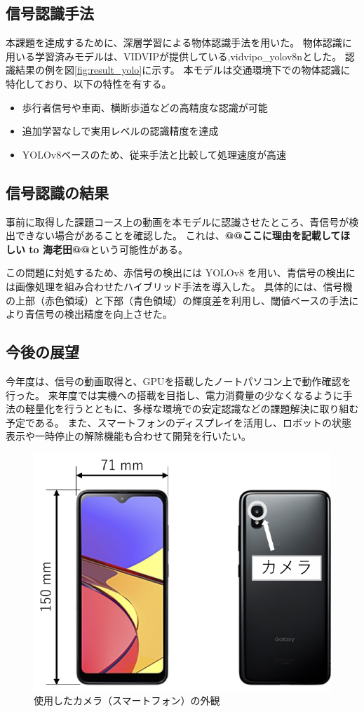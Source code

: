 \documentclass[twocolumn,9pt]{jsproceedings}
\begin{document}
\subsection{信号認識手法}
本課題を達成するために、深層学習による物体認識手法を用いた。
物体認識に用いる学習済みモデルは、VIDVIP\cite{BabaVIDVIP}が提供している,vidvipo\_yolov8nとした。
認識結果の例を図\ref{fig:result_yolo}に示す。
本モデルは交通環境下での物体認識に特化しており、以下の特性を有する。

\begin{itemize}
    \item 歩行者信号や車両、横断歩道などの高精度な認識が可能
    \item 追加学習なしで実用レベルの認識精度を達成
    \item YOLOv8ベースのため、従来手法と比較して処理速度が高速
\end{itemize}

\subsection{信号認識の結果}
事前に取得した課題コース上の動画を本モデルに認識させたところ、青信号が検出できない場合があることを確認した。
これは、\textbf{@@ここに理由を記載してほしい to 海老田@@}という可能性がある。

この問題に対処するため、赤信号の検出には YOLOv8 を用い、青信号の検出には画像処理を組み合わせたハイブリッド手法を導入した。
具体的には、信号機の上部（赤色領域）と下部（青色領域）の輝度差を利用し、閾値ベースの手法により青信号の検出精度を向上させた。

\subsection{今後の展望}
今年度は、信号の動画取得と、GPUを搭載したノートパソコン上で動作確認を行った。
来年度では実機への搭載を目指し、電力消費量の少なくなるように手法の軽量化を行うとともに、多様な環境での安定認識などの課題解決に取り組む予定である。
また、スマートフォンのディスプレイを活用し、ロボットの状態表示や一時停止の解除機能も合わせて開発を行いたい。

\begin{figure}[h]
  \begin{center}
    \includegraphics[width=0.6\linewidth]{figs/smartphone.pdf}
    \caption{使用したカメラ（スマートフォン）の外観}
    \label{fig:smartphone}
  \end{center}
\end{figure}
\end{document}
